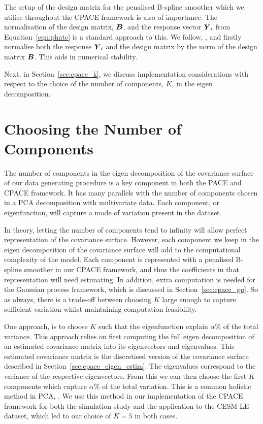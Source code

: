 The setup of the design matrix for the penalised B-spline smoother which we utilise throughout the CPACE framework is also of importance.
The normalisation of the design matrix, $\bm{{B}}$, and the response vector $\bm{{Y}}_{i}$ from Equation~\eqref{eqn:phatc} is a standard approach to this.
We follow, \citep{wood_generalized_2006}, and firstly normalise both the response $\bm{{Y}}_{i}$ and the design matrix by the norm of the design matrix $\bm{{B}}$.
This aids in numerical stability. 

Next, in Section~\ref{sec:cpace_k}, we discuss implementation considerations with respect to the choice of the number of components, $K$, in the eigen decomposition.

\section{Choosing the Number of Components \label{sec:cpace_k}}
The number of components in the eigen decomposition of the covariance surface of our data generating procedure is a key component in both the PACE and CPACE framework.
It has many parallels with the number of components chosen in a PCA decomposition with multivariate data. 
Each component, or eigenfunction, will capture a mode of variation present in the dataset.

In theory, letting the number of components tend to infinity will allow perfect representation of the covariance surface.
However, each component we keep in the eigen decomposition of the covariance surface will add to the computational complexity of the model.
Each component is represented with a penalised B-spline smoother in our CPACE framework, and thus the coefficients in that representation will need estimating. 
In addition, extra computation is needed for the Gaussian process framework, which is discussed in Section~\ref{sec:cpace_gp}.
So as always, there is a trade-off between choosing $K$ large enough to capture sufficient variation whilst maintaining computation feasibility.

One approach, is to choose $K$ such that the eigenfunction explain $\alpha$\% of the total variance.
This approach relies on first computing the full eigen decomposition of an estimated covariance matrix into its eigenvectors and eigenvalues.
This estimated covariance matrix is the discretised version of the covariance surface described in Section~\ref{sec:cpace_eigen_estim}.
The eigenvalues correspond to the variance of the respective eigenvectors.
From this we can then choose the first $K$ components which capture $\alpha$\% of the total variation. 
This is a common holistic method in PCA, \citep{jolliffe_choosing_2002}.
We use this method in our implementation of the CPACE framework for both the simulation study and the application to the CESM-LE dataset, which led to our choice of $K=5$ in both cases.

